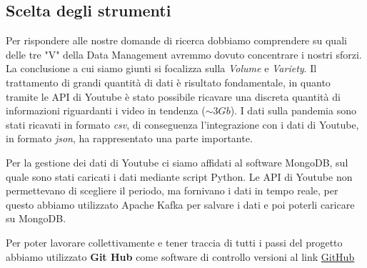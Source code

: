\subsection*{Scelta degli strumenti}
Per rispondere alle nostre domande di ricerca dobbiamo comprendere su quali delle tre "V" della Data Management avremmo dovuto concentrare i nostri sforzi. La conclusione a cui siamo giunti si focalizza sulla \textit{Volume} e \textit{Variety}. Il trattamento di grandi quantità di dati è risultato fondamentale, in quanto tramite le API di Youtube è stato possibile ricavare una discreta quantità di informazioni riguardanti i video in tendenza ($\sim 3Gb$). I dati sulla pandemia sono stati ricavati in formato \textit{csv}, di conseguenza l'integrazione con i dati di Youtube, in formato \textit{json}, ha rappresentato una parte importante.

Per la gestione dei dati di Youtube ci siamo affidati al software MongoDB, sul quale sono stati caricati i dati mediante script Python. Le API di Youtube non permettevano di scegliere il periodo, ma fornivano i dati in tempo reale, per questo abbiamo utilizzato Apache Kafka per salvare i dati e poi poterli caricare su MongoDB.
 
Per poter lavorare collettivamente e tener traccia di tutti i passi del progetto abbiamo utilizzato \textbf{Git Hub} come software di controllo versioni al link \href{https://github.com/fedelux3/Youtube_trending_analysis}{GitHub} 
